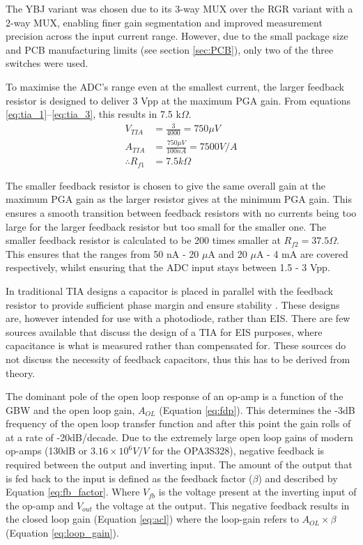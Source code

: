 The YBJ variant was chosen due to its 3-way \ac{MUX} over the RGR variant with a 2-way \ac{MUX}, enabling finer gain segmentation and improved measurement precision across the input current range. However, due to the small package size and PCB manufacturing limits (see section \ref{sec:PCB}), only two of the three switches were used.

To maximise the \ac{ADC}'s range even at the smallest current, the larger feedback resistor is designed to deliver 3 Vpp at the maximum \ac{PGA} gain. From equations \ref{eq:tia_1}--\ref{eq:tia_3}, this results in 7.5 k$\Omega$.
\begin{align}
        V_{TIA} &= \frac{3}{4000} = 750 \mu V \label{eq:tia_1}\\
        A_{TIA} &= \frac{750 \mu V}{100 nA} = 7500 V/A \\
        \therefore  R_{f1} &= 7.5 k\Omega \label{eq:tia_3}
\end{align}

The smaller feedback resistor is chosen to give the same overall gain at the maximum \ac{PGA} gain as the larger resistor gives at the minimum \ac{PGA} gain. This ensures a smooth transition between feedback resistors with no currents being too large for the larger feedback resistor but too small for the smaller one. The smaller feedback resistor is calculated to be 200 times smaller at $R_{f2}=37.5 \Omega$. This ensures that the ranges from 50 nA - 20 $\mu$A and 20 $\mu$A - 4 mA are covered respectively, whilst ensuring that the \ac{ADC} input stays between 1.5 - 3 Vpp.

In traditional TIA designs a capacitor is placed in parallel with the feedback resistor to provide sufficient phase margin and ensure stability \cite{StabilizeYourTransimpedance}. These designs are, however intended for use with a photodiode, rather than \ac{EIS}. There are few sources available that discuss the design of a TIA for EIS purposes, where capacitance is what is measured rather than compensated for. These sources do not discuss the necessity of feedback capacitors, thus this has to be derived from theory.

The dominant pole of the open loop response of an op-amp is a function of the GBW and the open loop gain, $A_{OL}$ (Equation \ref{eq:fdp}). This determines the -3dB frequency of the open loop transfer function and after this point the gain rolls of at a rate of -20dB/decade. Due to the extremely large open loop gains of modern op-amps (130dB or $3.16 \times 10^6 V/V$ for the OPA3S328), negative feedback is required between the output and inverting input. The amount of the output that is fed back to the input is defined as the feedback factor ($\beta$) and described by Equation \ref{eq:fb_factor}. Where $V_{fb}$ is the voltage present at the inverting input of the op-amp and $V_{out}$ the voltage at the output. This negative feedback results in the closed loop gain (Equation \ref{eq:acl}) where the loop-gain refers to $A_{OL}\times\beta$ (Equation \ref{eq:loop_gain}).

